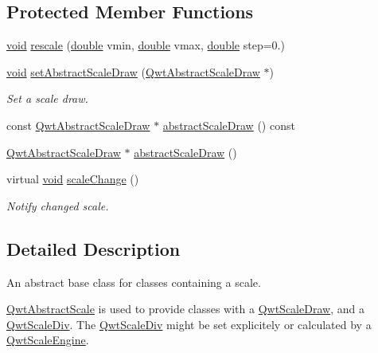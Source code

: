 \subsection*{Protected Member Functions}
\begin{DoxyCompactItemize}
\item 
\hyperlink{group___u_a_v_objects_plugin_ga444cf2ff3f0ecbe028adce838d373f5c}{void} \hyperlink{class_qwt_abstract_scale_abd7c6b312b41882a3b509aadc9ada46e}{rescale} (\hyperlink{_super_l_u_support_8h_a8956b2b9f49bf918deed98379d159ca7}{double} vmin, \hyperlink{_super_l_u_support_8h_a8956b2b9f49bf918deed98379d159ca7}{double} vmax, \hyperlink{_super_l_u_support_8h_a8956b2b9f49bf918deed98379d159ca7}{double} step=0.)
\item 
\hyperlink{group___u_a_v_objects_plugin_ga444cf2ff3f0ecbe028adce838d373f5c}{void} \hyperlink{class_qwt_abstract_scale_a950c5bf521dc704b78f76c7951346288}{set\-Abstract\-Scale\-Draw} (\hyperlink{class_qwt_abstract_scale_draw}{Qwt\-Abstract\-Scale\-Draw} $\ast$)
\begin{DoxyCompactList}\small\item\em Set a scale draw. \end{DoxyCompactList}\item 
const \hyperlink{class_qwt_abstract_scale_draw}{Qwt\-Abstract\-Scale\-Draw} $\ast$ \hyperlink{class_qwt_abstract_scale_ab3c5f30892792e5ca3d84f4409ef6216}{abstract\-Scale\-Draw} () const 
\item 
\hyperlink{class_qwt_abstract_scale_draw}{Qwt\-Abstract\-Scale\-Draw} $\ast$ \hyperlink{class_qwt_abstract_scale_aa61afdff037ef745a6dad686537cdb96}{abstract\-Scale\-Draw} ()
\item 
virtual \hyperlink{group___u_a_v_objects_plugin_ga444cf2ff3f0ecbe028adce838d373f5c}{void} \hyperlink{class_qwt_abstract_scale_a0dbb7bdc557c0a7b163643e41970ed6a}{scale\-Change} ()
\begin{DoxyCompactList}\small\item\em Notify changed scale. \end{DoxyCompactList}\end{DoxyCompactItemize}


\subsection{Detailed Description}
An abstract base class for classes containing a scale. 

\hyperlink{class_qwt_abstract_scale}{Qwt\-Abstract\-Scale} is used to provide classes with a \hyperlink{class_qwt_scale_draw}{Qwt\-Scale\-Draw}, and a \hyperlink{class_qwt_scale_div}{Qwt\-Scale\-Div}. The \hyperlink{class_qwt_scale_div}{Qwt\-Scale\-Div} might be set explicitely or calculated by a \hyperlink{class_qwt_scale_engine}{Qwt\-Scale\-Engine}. 

